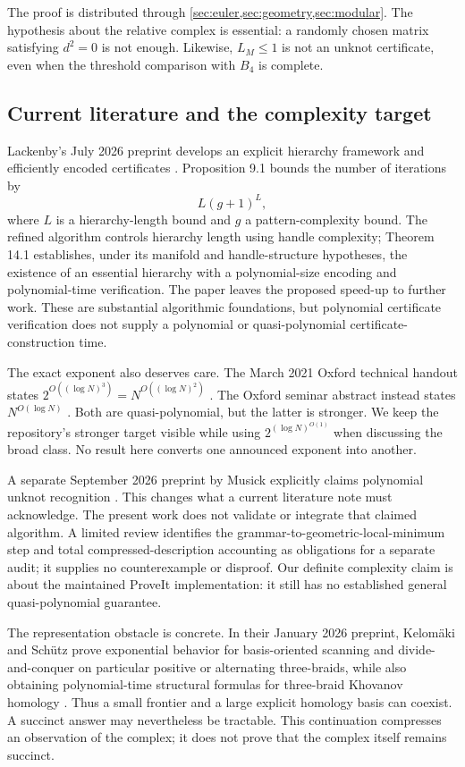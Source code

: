 The proof is distributed through \cref{sec:euler,sec:geometry,sec:modular}.
The hypothesis about the relative complex is essential: a randomly chosen
matrix satisfying $d^2=0$ is not enough. Likewise, $L_M\le1$ is not an unknot
certificate, even when the threshold comparison with $B_4$ is complete.

\subsection{Current literature and the complexity target}

Lackenby's July 2026 preprint develops an explicit hierarchy framework and
efficiently encoded certificates \cite{lackenby2026}. Proposition 9.1 bounds
the number of iterations by
\[
                         L(g+1)^L,
\]
where $L$ is a hierarchy-length bound and $g$ a pattern-complexity bound.
The refined algorithm controls hierarchy length using handle complexity;
Theorem 14.1 establishes, under its manifold and handle-structure
hypotheses, the existence of an essential hierarchy with a polynomial-size
encoding and polynomial-time verification. The paper leaves the proposed speed-up to further work. These are
substantial algorithmic foundations, but polynomial certificate verification
does not supply a polynomial or quasi-polynomial certificate-construction time.

The exact exponent also deserves care. The March 2021 Oxford technical
handout states $2^{O((\log N)^3)}=N^{O((\log N)^2)}$ \cite{lackenbytalk}.
The Oxford seminar abstract instead states $N^{O(\log N)}$
\cite{lackenbyabstract}. Both are
quasi-polynomial, but the latter is stronger. We keep the repository's stronger
target visible while using $2^{(\log N)^{O(1)}}$ when discussing the broad class.
No result here converts one announced exponent into another.

A separate September 2026 preprint by Musick explicitly claims polynomial
unknot recognition \cite{musick}. This changes what a current literature note
must acknowledge. The present work does not validate or integrate that claimed
algorithm. A limited review identifies the grammar-to-geometric-local-minimum
step and total compressed-description accounting as obligations for a separate
audit; it supplies no counterexample or disproof. Our definite complexity claim
is about the maintained ProveIt implementation: it still has no established
general quasi-polynomial guarantee.

The representation obstacle is concrete. In their January 2026 preprint,
Kelom\"aki and Sch\"utz prove
exponential behavior for basis-oriented scanning and divide-and-conquer on
particular positive or alternating three-braids, while also obtaining
polynomial-time structural formulas for three-braid Khovanov homology
\cite{kelomaki}. Thus a small frontier and a large explicit homology basis can
coexist. A succinct answer may nevertheless be tractable. This continuation
compresses an observation of the complex; it does not prove that the complex
itself remains succinct.

